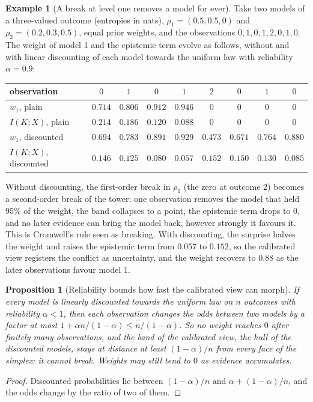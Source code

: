 \documentclass[11pt]{article}
\newtheorem{proposition}[theorem]{Proposition}
\theoremstyle{definition}
\newtheorem{example}[theorem]{Example}
\theoremstyle{remark}
\begin{document}
\begin{example}[A break at level one removes a model for ever]\label{ex:cromwell}
Take two models of a three-valued outcome (entropies in nats), $\rho_1=(0.5,0.5,0)$ and $\rho_2=(0.2,0.3,0.5)$, equal prior weights, and the observations
$0,1,0,1,2,0,1,0$. The weight of model 1 and the epistemic term evolve as follows, without and with linear discounting of each model towards the
uniform law with reliability $\alpha=0.9$:
\begin{center}
\begin{tabular}{lcccccccc}
\toprule
observation & $0$ & $1$ & $0$ & $1$ & $2$ & $0$ & $1$ & $0$\\
\midrule
$w_1$, plain & $0.714$ & $0.806$ & $0.912$ & $0.946$ & $0$ & $0$ & $0$ & $0$\\
$I(K;X)$, plain & $0.214$ & $0.186$ & $0.120$ & $0.088$ & $0$ & $0$ & $0$ & $0$\\
$w_1$, discounted & $0.694$ & $0.783$ & $0.891$ & $0.929$ & $0.473$ & $0.671$ & $0.764$ & $0.880$\\
$I(K;X)$, discounted & $0.146$ & $0.125$ & $0.080$ & $0.057$ & $0.152$ & $0.150$ & $0.130$ & $0.085$\\
\bottomrule
\end{tabular}
\end{center}
Without discounting, the first-order break in $\rho_1$ (the zero at outcome $2$) becomes a second-order break of the tower: one
observation removes the model that held $95\%$ of the weight, the band collapses to a point, the epistemic term drops to $0$, and no
later evidence can bring the model back, however strongly it favours it. This is Cromwell's rule seen as breaking. With discounting, the
surprise halves the weight and raises the epistemic term from $0.057$ to $0.152$, so the calibrated view registers the conflict as
uncertainty, and the weight recovers to $0.88$ as the later observations favour model 1.
\end{example}

\begin{proposition}[Reliability bounds how fast the calibrated view can morph]\label{prop:morph}
If every model is linearly discounted towards the uniform law on $n$ outcomes with reliability $\alpha<1$, then each observation changes the
odds between two models by a factor at most $1+\alpha n/(1-\alpha)\le n/(1-\alpha)$. So no weight reaches $0$ after finitely many observations,
and the band of the calibrated view, the hull of the discounted models, stays at distance at least $(1-\alpha)/n$ from every face of the
simplex: it cannot break. Weights may still tend to $0$ as evidence accumulates.
\end{proposition}
\begin{proof}
Discounted probabilities lie between $(1-\alpha)/n$ and $\alpha+(1-\alpha)/n$, and the odds change by the ratio of two of them.
\end{proof}
\end{document}
